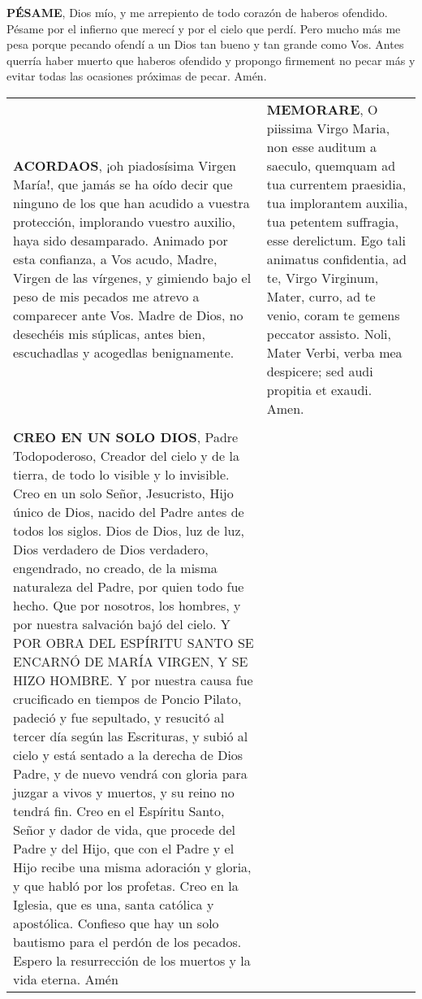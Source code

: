 \documentclass[./rosary.tex]{subfiles}
\begin{document}
\bigskip

\label{condolences}
\textbf{PÉSAME}, Dios mío, y me arrepiento de todo corazón de haberos ofendido. Pésame por el infierno que merecí y por el cielo que perdí. Pero mucho
más me pesa porque pecando ofendí a un Dios tan bueno y tan grande como Vos. Antes querría haber muerto que haberos ofendido y propongo firmement no pecar
más y evitar todas las ocasiones próximas de pecar. Amén.

\bigskip

\begin{longtable} { p{} p{} }
    \label{memorare}
    \textbf{ACORDAOS}, ¡oh piadosísima Virgen María!, que jamás se ha oído decir que ninguno de los que han acudido a vuestra protección, 
    implorando vuestro auxilio, haya sido desamparado. Animado por esta confianza, a Vos acudo, Madre, Virgen de las vírgenes, y gimiendo 
    bajo el peso de mis pecados me atrevo a comparecer ante Vos. Madre de Dios, no desechéis mis súplicas, antes bien, escuchadlas y 
    acogedlas benignamente.

        &

    \textbf{MEMORARE}, O piissima Virgo Maria, non esse auditum a saeculo, quemquam ad tua currentem praesidia, tua implorantem auxilia, 
    tua petentem suffragia, esse derelictum. Ego tali animatus confidentia, ad te, Virgo Virginum, Mater, curro, ad te venio, coram te gemens 
    peccator assisto. Noli, Mater Verbi, verba mea despicere; sed audi propitia et exaudi. Amen.\\\\
    
    \label{creed-nicene}
    \textbf{CREO EN UN SOLO DIOS}, Padre Todopoderoso, Creador del cielo y de la tierra, de todo lo visible y lo invisible. 
    Creo en un solo Señor, Jesucristo, Hijo único de Dios, nacido del Padre antes de todos los siglos. Dios de Dios, luz de luz, 
    Dios verdadero de Dios verdadero, engendrado, no creado, de la misma naturaleza del Padre, por quien todo fue hecho. Que por nosotros, los hombres, 
    y por nuestra salvación bajó del cielo. Y POR OBRA DEL ESPÍRITU SANTO SE ENCARNÓ DE MARÍA VIRGEN, Y SE HIZO HOMBRE. 
    Y por nuestra causa fue crucificado en tiempos de Poncio Pilato, padeció y fue sepultado, y resucitó al tercer día según las Escrituras, 
    y subió al cielo y está sentado a la derecha de Dios Padre, y de nuevo vendrá con gloria para juzgar a vivos y muertos, y su reino no tendrá fin. 
    Creo en el Espíritu Santo, Señor y dador de vida, que procede del Padre y del Hijo, que con el Padre y el Hijo recibe una misma adoración y gloria, 
    y que habló por los profetas. Creo en la Iglesia, que es una, santa católica y apostólica. Confieso que hay un solo bautismo para el perdón de los pecados. 
    Espero la resurrección de los muertos y la vida eterna. Amén


\end{longtable}
\end{document}
